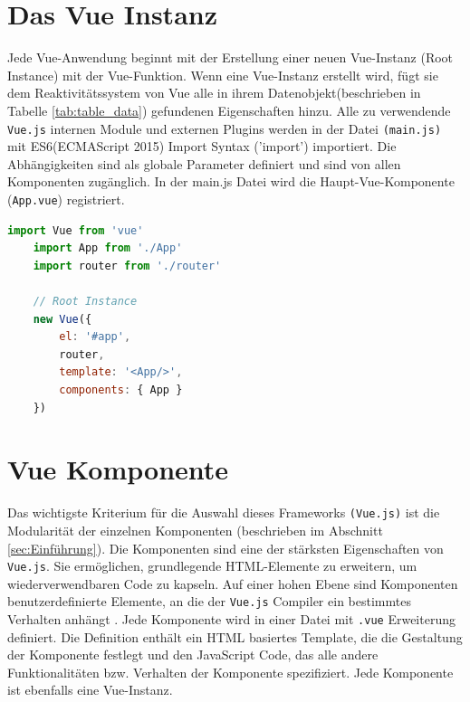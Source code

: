 \section{Das Vue Instanz} Jede Vue-Anwendung beginnt mit der Erstellung einer neuen Vue-Instanz (Root Instance) mit der Vue-Funktion. Wenn eine Vue-Instanz erstellt wird, fügt sie dem Reaktivitätssystem von Vue alle in ihrem Datenobjekt(beschrieben in Tabelle \ref{tab:table_data}) gefundenen Eigenschaften hinzu.  Alle zu verwendende \texttt{Vue.js} internen Module und externen Plugins werden in der Datei \texttt{(main.js)} mit ES6(ECMAScript 2015) Import Syntax ('import') importiert. Die Abhängigkeiten sind als globale Parameter definiert und sind von allen Komponenten zugänglich.  
In der main.js Datei wird die Haupt-Vue-Komponente (\texttt{App.vue}) registriert. 
\begin{lstlisting}[language=JavaScript, caption=main.js]
    import Vue from 'vue'
    import App from './App'
    import router from './router'

    // Root Instance
    new Vue({
        el: '#app',
        router,
        template: '<App/>',
        components: { App }
    })

\end{lstlisting}

\section{Vue Komponente}Das wichtigste Kriterium für die Auswahl dieses Frameworks \texttt{(Vue.js)} ist die Modularität der einzelnen Komponenten (beschrieben im Abschnitt \ref{sec:Einführung}). Die Komponenten sind eine der stärksten Eigenschaften von \texttt{Vue.js}. Sie ermöglichen, grundlegende HTML-Elemente zu erweitern, um wiederverwendbaren Code zu kapseln. Auf einer hohen Ebene sind Komponenten benutzerdefinierte Elemente, an die der \texttt{Vue.js} Compiler ein bestimmtes Verhalten anhängt \cite{Vue019:Intro:Online}. Jede Komponente wird in einer Datei mit \texttt{.vue} Erweiterung definiert. Die Definition enthält ein HTML basiertes Template, die die Gestaltung der Komponente festlegt und den JavaScript Code, das alle andere Funktionalitäten bzw. Verhalten der Komponente spezifiziert. Jede Komponente ist ebenfalls eine Vue-Instanz.

